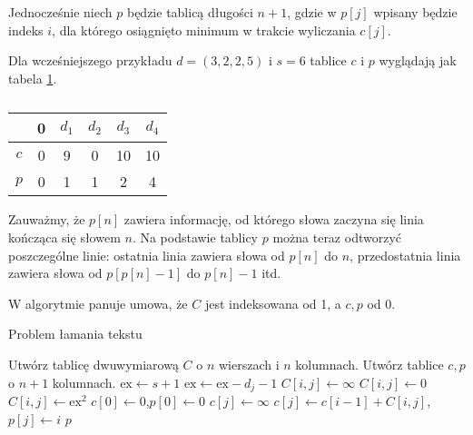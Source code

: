 Jednocześnie niech $p$ będzie tablicą długości $n+1$, gdzie w $p[j]$ wpisany będzie indeks $i$, dla którego osiągnięto minimum w trakcie wyliczania $c[j]$.

Dla wcześniejszego przykładu $d=(3,2,2,5)$ i $s=6$ tablice $c$ i $p$ wyglądają jak tabela \ref{tab_zad13_c}.
\begin{table}[H]
	\centering
	\def\arraystretch{1.25}
	\begin{tabular}{|c|ccccc|}
		\hline & \multicolumn{1}{c|}{0} & \multicolumn{1}{c|}{$d_1$} & \multicolumn{1}{c|}{$d_2$} & \multicolumn{1}{c|}{$d_3$} & \multicolumn{1}{c|}{$d_4$} \\ \hline
		$c$ & 0 & 9 & 0 & 10 & 10 \\ \cline{1-1}
		$p$ & 0 & 1 & 1 & 2 & 4 \\ \cline{1-1}
		\hline
	\end{tabular}
	\caption{}
	\label{tab_zad13_c}
\end{table}

Zauważmy, że $p[n]$ zawiera informację, od którego słowa zaczyna się linia kończąca się słowem $n$. Na podstawie tablicy $p$ można teraz odtworzyć poszczególne linie: ostatnia linia zawiera słowa od $p[n]$ do $n$, przedostatnia linia zawiera słowa od $p[p[n]-1]$ do $p[n]-1$ itd.

W algorytmie panuje umowa, że $C$ jest indeksowana od 1, a $c,p$ od 0.
\begin{algorithm}[H]
	\caption{Problem łamania tekstu}\label{Zadanie13}
	\begin{algorithmic}[1]
			\State Utwórz tablicę dwuwymiarową $C$ o $n$ wierszach i $n$ kolumnach.
			\State Utwórz tablice $c,p$ o $n+1$ kolumnach.
				\State $\textrm{ex}\gets s+1$
					\State $\textrm{ex}\gets \textrm{ex} - d_j - 1$
						\State $C[i,j]\gets\infty$
						\State $C[i,j]\gets0$
					\Else
						\State $C[i,j]\gets\textrm{ex}^2$
					\EndIf
				\EndFor
			\EndFor
			\State $c[0]\gets0$,\quad$p[0]\gets0$
				\State $c[j]\gets\infty$
						\State $c[j]\gets c[i-1]+C[i,j]$,\qquad$p[j]\gets i$
					\EndIf
				\EndFor
			\EndFor
			\State \Return $p$
		\EndProcedure
	\end{algorithmic}
\end{algorithm}


